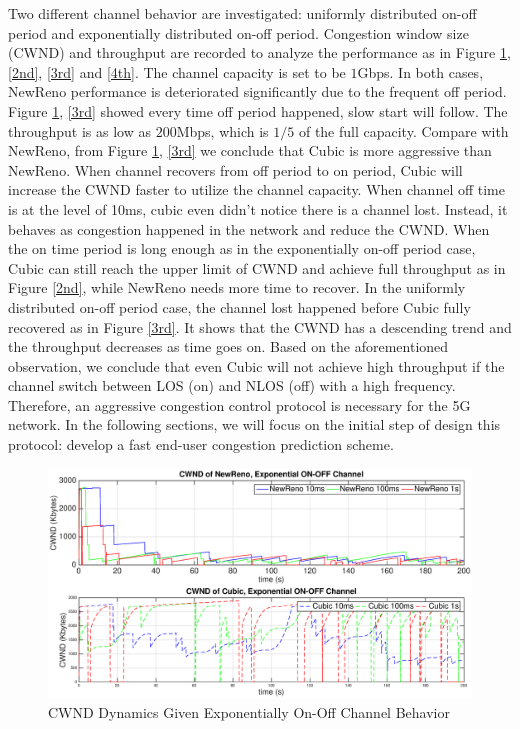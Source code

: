 Two different channel behavior are investigated: uniformly distributed on-off period and exponentially distributed on-off period. Congestion window size (CWND) and throughput are recorded to analyze the performance as in Figure \ref{1st}, \ref{2nd}, \ref{3rd} and \ref{4th}.  The channel capacity is set to be $1$Gbps. In both cases, NewReno performance is deteriorated significantly due to the frequent off period. Figure \ref{1st}, \ref{3rd} showed every time off period happened, slow start will follow. The throughput is as low as $200$Mbps, which is $1/5$ of the full capacity. Compare with NewReno, from Figure \ref{1st}, \ref{3rd} we conclude that Cubic is more aggressive than NewReno. When channel recovers from off period to on period, Cubic will increase the CWND faster to utilize the channel capacity.  When channel off time is at the level of 10ms, cubic even didn't notice there is a channel lost. Instead, it behaves as congestion happened in the network and reduce the CWND. When the on time period is long enough as in the exponentially on-off period case, Cubic can still reach the upper limit of CWND and achieve full throughput as in Figure \ref{2nd}, while NewReno needs more time to recover. In the uniformly distributed on-off period case, the channel lost happened before Cubic fully recovered as in Figure \ref{3rd}. It shows that the CWND has a descending trend and the throughput decreases as time goes on. Based on the aforementioned observation, we conclude that even Cubic will not achieve high throughput if the channel switch between LOS (on) and NLOS (off) with a high frequency. Therefore, an aggressive congestion control protocol is necessary for the 5G network. In the following sections, we will focus on the initial step of design this protocol: develop a fast end-user congestion prediction scheme.
\begin{figure}
\centering
\includegraphics[width=14cm]{1.eps}
\caption{CWND Dynamics Given Exponentially On-Off Channel Behavior}
\label{1st}
\end{figure}
